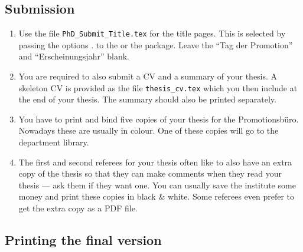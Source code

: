 \subsection{Submission}

\begin{enumerate}
\item Use the file \texttt{PhD\_Submit\_Title.tex} for the title
  pages. 
  This is selected by passing the options .
  to the  or the  package.
  Leave the \foreignquote{ngerman}{Tag der Promotion} and
  \foreignquote{ngerman}{Erscheinungsjahr} blank.
\item You are required to also submit a CV and a summary of your
  thesis. A skeleton CV is provided as the file
  \texttt{thesis\_cv.tex} which you then include at the end of your
  thesis. The summary should also be printed separately.
\item You have to print and bind five copies of your thesis for the
  \foreignlanguage{ngerman}{Promotionsbüro}. Nowadays these are
  usually in colour.
  One of these copies will go to the department library.
\item The first and second referees for your thesis often like to also
  have an extra copy of the thesis so that they can make comments when they read
  your thesis --- ask them if they want one. You can usually save the
  institute some money and print these copies in black \& white.
  Some referees even prefer to get the extra copy as a PDF file.
\end{enumerate}


\subsection{Printing the final version}

